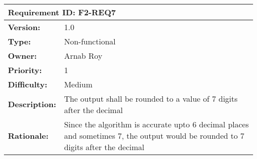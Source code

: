 \documentclass[12pt]{article}
\begin{document}
\\[10pt]
\begin{tabular}{ |p{4cm} | p{10cm}| }
 \hline
 \multicolumn{2}{|l|}{\textbf{Requirement ID: F2-REQ7}}\\
 \hline
 \textbf{Version:} & 1.0\\
 \textbf{Type:} & Non-functional\\
 \textbf{Owner:} & Arnab Roy\\
 \textbf{Priority:} & 1\\
 \textbf{Difficulty:} & Medium\\
 \textbf{Description:} & The output shall be rounded to a value of 7 digits after the decimal\\
 \textbf{Rationale:} & Since the algorithm is accurate upto 6 decimal places and sometimes 7, the output would be rounded to 7 digits after the decimal\\
 \hline
\end{tabular}
\\
\end{document}

